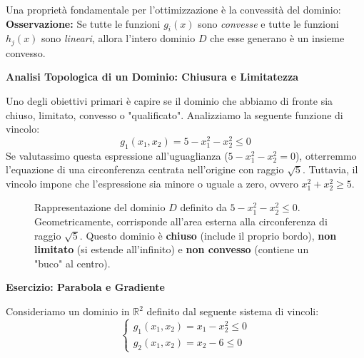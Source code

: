 \documentclass[12pt, a4paper]{article}
\newcommand{\separatore}{\noindent{\color{titlecolor!50}\rule{\textwidth}{0.6pt}}}
\begin{document}
	Una proprietà fondamentale per l'ottimizzazione è la convessità del dominio:
	\textbf{Osservazione:} Se tutte le funzioni $g_i(x)$ sono \textit{convesse} e tutte le funzioni $h_j(x)$ sono \textit{lineari}, allora l'intero dominio $D$ che esse generano è un insieme convesso.
	
	\vspace{0.4cm}
	\textbf{Analisi Topologica di un Dominio: Chiusura e Limitatezza}
	
	Uno degli obiettivi primari è capire se il dominio che abbiamo di fronte sia chiuso, limitato, convesso o "qualificato". Analizziamo la seguente funzione di vincolo:
	\[
	g_1(x_1, x_2) = 5 - x_1^2 - x_2^2 \le 0
	\]
	Se valutassimo questa espressione all'uguaglianza ($5 - x_1^2 - x_2^2 = 0$), otterremmo l'equazione di una circonferenza centrata nell'origine con raggio $\sqrt{5}$. Tuttavia, il vincolo impone che l'espressione sia minore o uguale a zero, ovvero $x_1^2 + x_2^2 \ge 5$.
	
	\begin{figure}[H]
		\centering
		\caption{Rappresentazione del dominio $D$ definito da $5 - x_1^2 - x_2^2 \le 0$. Geometricamente, corrisponde all'area esterna alla circonferenza di raggio $\sqrt{5}$. Questo dominio è \textbf{chiuso} (include il proprio bordo), \textbf{non limitato} (si estende all'infinito) e \textbf{non convesso} (contiene un "buco" al centro).}
	\end{figure}
	
	\vspace{0.6cm}
	\separatore
	\vspace{0.4cm}
	
	\textbf{Esercizio: Parabola e Gradiente}
	
	Consideriamo un dominio in $\mathbb{R}^2$ definito dal seguente sistema di vincoli:
	\[
	\begin{cases}
		g_1(x_1, x_2) = x_1 - x_2^2 \le 0 \\
		g_2(x_1, x_2) = x_2 - 6 \le 0
	\end{cases}
	\]
	
\end{document}
